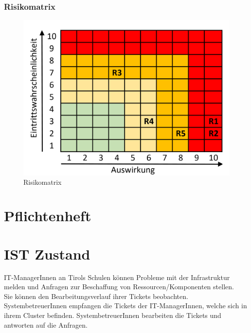 \subsubsection{Risikomatrix}
\begin{figure}[h]
	\centering
	\includegraphics[scale=0.6]{figures/matrix.png}
	\caption{Risikomatrix}
	\label{Abb_Risikomatrix}
\end{figure}


\newpage
\section{Pflichtenheft}
\section{IST Zustand}
IT-ManagerInnen an Tirols Schulen können Probleme mit der Infrastruktur melden und Anfragen zur Beschaffung von Ressourcen/Komponenten stellen.
\\
Sie können den Bearbeitungsverlauf ihrer Tickets beobachten. SystembetreuerInnen empfangen die Tickets der IT-ManagerInnen, welche sich in ihrem Cluster befinden. SystembetreuerInnen bearbeiten die Tickets und antworten auf die Anfragen.

